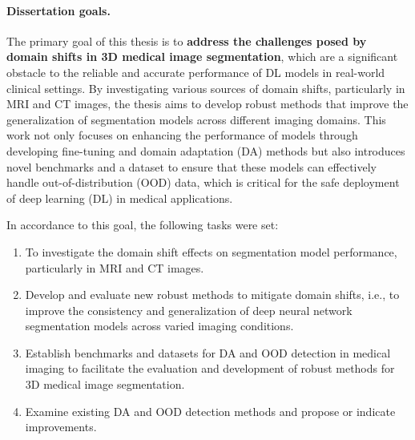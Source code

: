 
\paragraph{Dissertation goals.}

The primary goal of this thesis is to \textbf{address the challenges posed by domain shifts in 3D medical image segmentation}, which are a significant obstacle to the reliable and accurate performance of DL models in real-world clinical settings. By investigating various sources of domain shifts, particularly in MRI and CT images, the thesis aims to develop robust methods that improve the generalization of segmentation models across different imaging domains. This work not only focuses on enhancing the performance of models through developing fine-tuning and domain adaptation (DA) methods but also introduces novel benchmarks and a dataset to ensure that these models can effectively handle out-of-distribution (OOD) data, which is critical for the safe deployment of deep learning (DL) in medical applications.

In accordance to this goal, the following tasks were set:


\begin{enumerate}
    \item To investigate the domain shift effects on segmentation model performance, particularly in MRI and CT images.
    \item Develop and evaluate new robust methods to mitigate domain shifts, i.e., to improve the consistency and generalization of deep neural network segmentation models across varied imaging conditions.
    \item Establish benchmarks and datasets for DA and OOD detection in medical imaging to facilitate the evaluation and development of robust methods for 3D medical image segmentation.
    \item Examine existing DA and OOD detection methods and propose or indicate improvements.
\end{enumerate}


